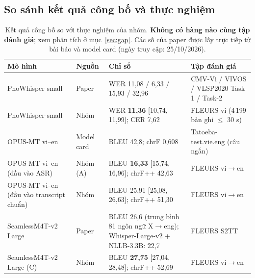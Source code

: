 \documentclass[12pt,a4paper]{article}
\newcommand{\ci}[2]{{\scriptsize[#1, #2]}}
\begin{document}
\subsection{So sánh kết quả công bố và thực nghiệm}
\begin{table}[H]\centering\small
\begin{tabularx}{\textwidth}{>{\raggedright\arraybackslash}p{2.6cm}>{\raggedright\arraybackslash}p{2.4cm}>{\raggedright\arraybackslash}p{2.2cm}Y}\toprule
Mô hình & Nguồn & Chỉ số & Tập đánh giá\\\midrule
PhoWhisper-small & Paper~\cite{phowhisper} & WER 11,08 / 6,33 / 15,93 / 32,96 & CMV-Vi / VIVOS / VLSP2020 Task-1 / Task-2\\
PhoWhisper-small & Nhóm & WER \textbf{11,36} \ci{10,74}{11,99}; CER 7,62 & FLEURS vi (4\,199 bản ghi $\le$ 30 s)\\\midrule
OPUS-MT vi--en & Model card~\cite{opusmt} & BLEU 42,8; chrF 0,608 & Tatoeba-test.vie.eng (câu ngắn)\\
OPUS-MT vi--en (đầu vào ASR) & Nhóm (A) & BLEU \textbf{16,33} \ci{15,74}{16,96}; chrF++ 42,63 & FLEURS vi$\rightarrow$en\\
OPUS-MT vi--en (đầu vào transcript chuẩn) & Nhóm & BLEU 25,91 \ci{25,08}{26,63}; chrF++ 51,30 & FLEURS vi$\rightarrow$en\\\midrule
SeamlessM4T-v2 Large & Paper~\cite{seamless} & BLEU 26,6 (trung bình 81 ngôn ngữ X$\rightarrow$eng); Whisper-Large-v2 + NLLB-3.3B: 22,7 & FLEURS S2TT\\
SeamlessM4T-v2 Large (C) & Nhóm & BLEU \textbf{27,75} \ci{27,04}{28,48}; chrF++ 52,69 & FLEURS vi$\rightarrow$en\\
\bottomrule\end{tabularx}
\caption{Kết quả công bố so với thực nghiệm của nhóm. \textbf{Không có hàng nào cùng tập đánh giá}; xem phân tích ở mục~\ref{sec:gap}. Các số của paper được lấy trực tiếp từ bài báo và model card (ngày truy cập: 25/10/2026).}
\end{table}
\end{document}
